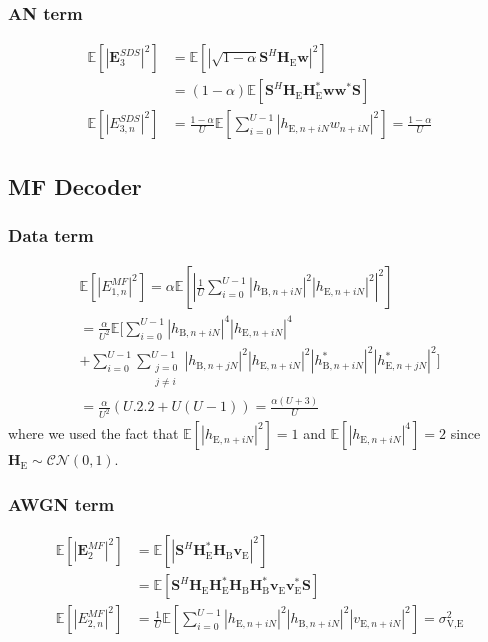 \documentclass[journal,comsoc]{IEEEtran}
\newcommand{\module}[1]{\left|#1\right|}
\newcommand{\EX}[1]{\mathbb{E} \left[#1\right]}%
\newcommand{\HE}{\textbf{H}_{\text{E}}}
\newcommand{\HB}{\textbf{H}_{\text{B}}}
\newcommand{\ve}{\textbf{v}_{\text{E}}}
\newcommand{\spread}{\textbf{S}}
\newcommand{\w}{\textbf{w}}
\begin{document}
\subsubsection{AN term}\label{sec:an-term-app-1}
\begin{equation}
	\begin{split}
		\EX{|\textbf{E}_{3}^{SDS}|^2} &=  \EX{\module{\sqrt{1-\alpha}\spread^H \HE \w}^2} \\
		&=(1-\alpha)\EX{\spread^H \HE\textbf{H}^*_{\text{E}} \w\w^* \spread } \\
		\EX{|E_{3,n}^{SDS}|^2}  &= \frac{1-\alpha}{U} \EX{\sum_{i=0}^{U-1} |h_{\text{E}, n + iN}w_{n + iN}|^2} = \frac{1-\alpha}{U}
	\end{split}
	\label{eq:appA:an_eve_filt0-app}
\end{equation}

\subsection{MF Decoder}\label{sec:matched-filtering-app}
\subsubsection{Data term}\label{sec:data-term-app-2}
\begin{multline}
	\EX{|E_{1,n}^{MF}|^2} = \alpha \EX{\left|\frac{1}{U}\sum_{i=0}^{U-1} \left| h_{\text{B}, n + iN}\right|^2 \left| h_{\text{E}, n + iN}\right|^2\right|^2} \\
	=\frac{\alpha}{U^2} \mathbb{E} \Bigg[\sum_{i=0}^{U-1} \left| h_{\text{B}, n + iN}\right|^4 \left| h_{\text{E}, n + iN}\right|^4 \\
	+ \sum_{i=0}^{U-1}\sum_{\substack{j=0 \\ j\neq i}}^{U-1}  \left| h_{\text{B}, n + jN}\right|^2 \left| h_{\text{E}, n + iN}\right|^2 \left| h^*_{\text{B}, n + iN}\right|^2 \left| h^*_{\text{E}, n + jN}\right|^2 \Bigg] \\
	= \frac{\alpha}{U^2} \left(U.2.2 + U(U-1) \right) = \frac{\alpha (U+3)}{U}
	\label{eq:data_eve_filt1-app}
\end{multline}
where we used the fact that $\EX{\left| h_{\text{E}, n + iN}\right|^2} = 1$ and $\EX{\left| h_{\text{E}, n + iN}\right|^4} = 2$ since $\HE \sim \mathcal{CN}(0,1)$.



\subsubsection{AWGN term}\label{sec:awgn-term-app-2}
\begin{equation}
	\begin{split}
		\EX{|\textbf{E}_{2}^{MF}|^2} &=  \EX{\module{\spread^H \HE^* \HB \ve}^2} \\
		&=\EX{\spread^H   \HE \HE^* \HB\HB^*  \ve \ve^* \spread } \\
		\EX{|E_{2,n}^{MF}|^2} &= \frac{1}{U} \EX{\sum_{i=0}^{U-1} |h_{\text{E}, n + iN}|^2 |h_{\text{B}, n + iN}|^2 |v_{\text{E}, n + iN}|^2} = \sigma^2_{\text{V,E}}
	\end{split}
	\label{eq:noise_eve_filt1-app}
\end{equation}
\end{document}
